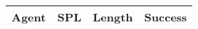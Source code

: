 \begin{tabular}{lccc}
    \toprule
    Agent & SPL & Length & Success \\
    \midrule

    \bottomrule
\end{tabular}
